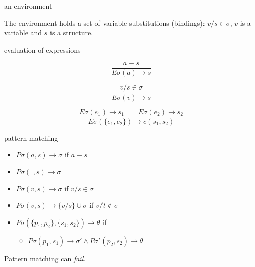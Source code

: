 \begin{frame}{an environment}

\pause\vspace{20pt}
The environment holds a set of variable substitutions (bindings):
$v/s \in \sigma$, $v$ is a variable and $s$ is a structure.


\end{frame}


\begin{frame}{evaluation of expressions}

\vspace{10pt}\pause $$\frac{a \equiv s}{E\sigma(a) \rightarrow s}$$

\vspace{10pt}\pause $$\frac{v/s \in \sigma}{E\sigma(v) \rightarrow s}$$

\vspace{10pt}\pause $$\frac{ E\sigma(e_1) \rightarrow s_1 \qquad   E\sigma(e_2) \rightarrow s_2}{E\sigma(\lbrace e_1 , e_2\rbrace) \rightarrow c(s_1, s_2)}$$

\pause\vspace{20pt}{\em Evaluation can result in $\perp$, if a variable is unbound.}

\end{frame}


\begin{frame}{pattern matching}

\begin{itemize}
  \pause \item $P\sigma(a, s) \rightarrow \sigma$  if  $a \equiv s$
  \pause \item $P\sigma(\_,s) \rightarrow \sigma$  
  \pause \item $P\sigma(v, s) \rightarrow \sigma$  if \pause $ v/s \in \sigma $
  \pause \item $P\sigma(v, s) \rightarrow \lbrace v/s \rbrace \cup \sigma$ if \pause $ v/t \not\in \sigma$
   \pause \item $P\sigma(\lbrace p_1, p_2 \rbrace, \lbrace s_1, s_2 \rbrace) \rightarrow \theta$ if
   \begin{itemize}
     \pause \item  $P\sigma(p_1, s_1) \rightarrow \sigma' \wedge P\sigma'(p_2, s_2) \rightarrow \theta$
   \end{itemize}

\end{itemize}

\pause\vspace{20pt}
Pattern matching can {\em fail}. 

\end{frame}

